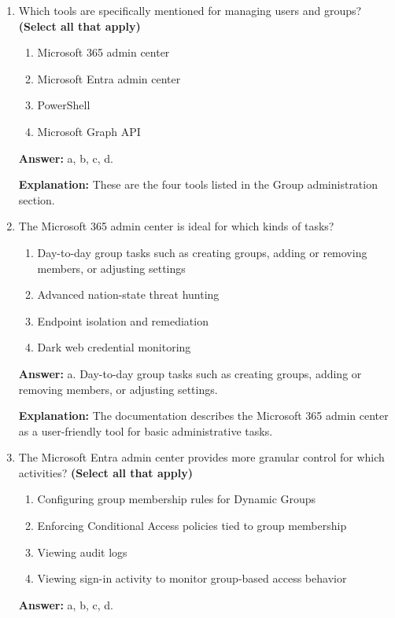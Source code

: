 \documentclass[10pt]{article}
\begin{document}
\begin{enumerate}[leftmargin=*]
\textbf{Explanation:} This is the exact dynamic group example used in the documentation.

\item Which tools are specifically mentioned for managing users and groups? \textbf{(Select all that apply)}
\begin{enumerate}[label=\alph*., leftmargin=1.5em]
\item Microsoft 365 admin center
\item Microsoft Entra admin center
\item PowerShell
\item Microsoft Graph API
\end{enumerate}
\textbf{Answer:} a, b, c, d.

\textbf{Explanation:} These are the four tools listed in the Group administration section.

\item The Microsoft 365 admin center is ideal for which kinds of tasks?
\begin{enumerate}[label=\alph*., leftmargin=1.5em]
\item Day-to-day group tasks such as creating groups, adding or removing members, or adjusting settings
\item Advanced nation-state threat hunting
\item Endpoint isolation and remediation
\item Dark web credential monitoring
\end{enumerate}
\textbf{Answer:} a. Day-to-day group tasks such as creating groups, adding or removing members, or adjusting settings.

\textbf{Explanation:} The documentation describes the Microsoft 365 admin center as a user-friendly tool for basic administrative tasks.

\item The Microsoft Entra admin center provides more granular control for which activities? \textbf{(Select all that apply)}
\begin{enumerate}[label=\alph*., leftmargin=1.5em]
\item Configuring group membership rules for Dynamic Groups
\item Enforcing Conditional Access policies tied to group membership
\item Viewing audit logs
\item Viewing sign-in activity to monitor group-based access behavior
\end{enumerate}
\textbf{Answer:} a, b, c, d.


\end{enumerate}
\end{document}
